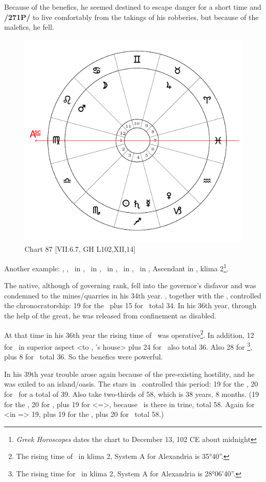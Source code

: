 Because of the benefics, he seemed destined to escape danger for a short time and \textbf{/271P/} to live comfortably from the takings of his robberies, but because of the malefics, he fell.

\newpage
\begin{figure}
\centering
\vspace{0pt}
\includegraphics[width=.68\textwidth]{charts/7_6_07}
\caption{Chart 87 [VII.6.7, GH L102,XII,14] }
\label{fig:chart87}
\end{figure} 

Another example: \Sun, \Saturn, \Mercury\, in \Sagittarius, \Moon\, in \Cancer, \Jupiter\, in \Taurus, \Mars\, in \Leo, \Venus\, in \Capricorn, Ascendant in \Virgo, klima 2\footnote{\textit{Greek Horoscopes} dates the chart to December 13, 102 CE about midnight}.

The native, although of governing rank, fell into the governor’s disfavor and was condemned to the mines/quarries in his 34th year. 
\Mars, together with the \Sun, controlled the chronocratorship: 19 for the \Sun\, plus 15 for \Mars\, total 34. In his 36th year, through the help of the great, he was released from confinement as disabled. 

At that time in his 36th year the rising time of \Leo\, was operative\footnote{The rising time of \Leo\, in klima 2, System A for Alexandria is 35°40''.}. In addition, 12 for \Jupiter\, in superior aspect <to \Scorpio, \Mars’s house> plus 24 for \Taurus\, also total 36. Also 28 for \Capricorn\footnote{The rising time for \Capricorn\, in klima 2, System A for Alexandria is 28°06'40''.}, plus 8 for \Venus\, total 36. So the benefics were powerful. 

In his 39th year trouble arose again because of the pre-existing hostility, and he was exiled to an island/oasis. The stars in \Sagittarius\, controlled this period: 19 for the \Sun, 20 for \Mercury\, for a total of 39. Also take two-thirds of 58, which is 38 years, 8 months. (19 for the \Sun, 20 for \Mercury, plus 19 for \Leo <=\Sun>, because \Mars\, is there in trine, total 58. Again for \Mars\, <in \Leo=\Sun> 19, plus 19 for the \Sun, plus 20 for \Mercury\, total 58.) 

